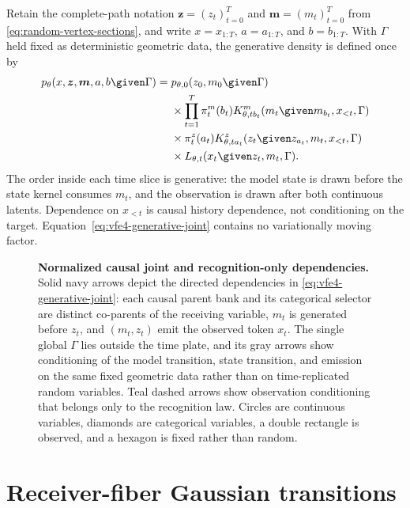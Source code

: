 Retain the complete-path notation $\boldsymbol z=(z_t)_{t=0}^{T}$ and $\boldsymbol m=(m_t)_{t=0}^{T}$ from \cref{eq:random-vertex-sections}, and write $x=x_{1:T}$, $a=a_{1:T}$, and $b=b_{1:T}$.  With $\Gamma$ held fixed as deterministic geometric data, the generative density is defined once by
\begin{equation}
\begin{aligned}
p_\theta(x,\boldsymbol z,\boldsymbol m,a,b\given\Gamma)
={}&p_{\theta,0}(z_0,m_0\given\Gamma)\\
&\times\prod_{t=1}^{T}\pi_t^m(b_t)
K^m_{\theta,tb_t}(m_t\given m_{b_t},x_{<t},\Gamma)\\
&\times\pi_t^z(a_t)
K^z_{\theta,ta_t}(z_t\given z_{a_t},m_t,x_{<t},\Gamma)\\
&\times L_{\theta,t}(x_t\given z_t,m_t,\Gamma).
\end{aligned}
\label{eq:vfe4-generative-joint}
\end{equation}
The order inside each time slice is generative: the model state is drawn before the state kernel consumes $m_t$, and the observation is drawn after both continuous latents.  Dependence on $x_{<t}$ is causal history dependence, not conditioning on the target.  Equation~\eqref{eq:vfe4-generative-joint} contains no variationally moving factor.

\begin{figure}[htbp]
\centering
\resizebox{\textwidth}{!}{}
\caption{%
\textbf{Normalized causal joint and recognition-only dependencies.}
Solid navy arrows depict the directed dependencies in \cref{eq:vfe4-generative-joint}: each causal parent bank and its categorical selector are distinct co-parents of the receiving variable, $m_t$ is generated before $z_t$, and $(m_t,z_t)$ emit the observed token $x_t$. The single global $\Gamma$ lies outside the time plate, and its gray arrows show conditioning of the model transition, state transition, and emission on the same fixed geometric data rather than on time-replicated random variables. Teal dashed arrows show observation conditioning that belongs only to the recognition law. Circles are continuous variables, diamonds are categorical variables, a double rectangle is observed, and a hexagon is fixed rather than random.
}
\label{fig:vfe4-factor-graph}
\end{figure}

\section{Receiver-fiber Gaussian transitions}

